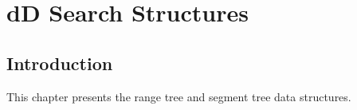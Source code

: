 \def\ccTagRmEigenClassName{\ccFalse}
\def\ccLongParamLayout{\ccTrue}

\ccThreeToTwo

\chapter{dD Search Structures} 
\label{Trees}



\section{Introduction}

This chapter presents the {\cgal} range tree and segment tree
data structures. 








